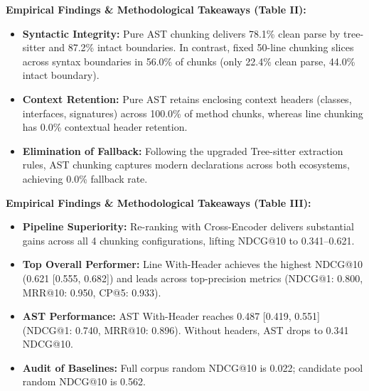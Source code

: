 \documentclass[11pt,a4paper,landscape]{article}
\begin{document}

\FloatBarrier
\vspace{-0.1cm}
{\small
\noindent\textbf{Empirical Findings \& Methodological Takeaways (Table II):}
\begin{itemize}[nosep,topsep=2pt,partopsep=0pt,itemsep=2pt]
    \item \textbf{Syntactic Integrity:} Pure AST chunking delivers 78.1\% clean parse by tree-sitter and 87.2\% intact boundaries. In contrast, fixed 50-line chunking slices across syntax boundaries in 56.0\% of chunks (only 22.4\% clean parse, 44.0\% intact boundary).
    \item \textbf{Context Retention:} Pure AST retains enclosing context headers (classes, interfaces, signatures) across 100.0\% of method chunks, whereas line chunking has 0.0\% contextual header retention.
    \item \textbf{Elimination of Fallback:} Following the upgraded Tree-sitter extraction rules, AST chunking captures modern declarations across both ecosystems, achieving 0.0\% fallback rate.
\end{itemize}
}
\clearpage


\FloatBarrier
\vspace{-0.1cm}
{\footnotesize
\noindent\textbf{Empirical Findings \& Methodological Takeaways (Table III):}
\begin{itemize}[nosep,topsep=2pt,partopsep=0pt,itemsep=2pt]
    \item \textbf{Pipeline Superiority:} Re-ranking with Cross-Encoder delivers substantial gains across all 4 chunking configurations, lifting NDCG@10 to 0.341--0.621.
    \item \textbf{Top Overall Performer:} Line With-Header achieves the highest NDCG@10 (0.621 [0.555, 0.682]) and leads across top-precision metrics (NDCG@1: 0.800, MRR@10: 0.950, CP@5: 0.933).
    \item \textbf{AST Performance:} AST With-Header reaches 0.487 [0.419, 0.551] (NDCG@1: 0.740, MRR@10: 0.896). Without headers, AST drops to 0.341 NDCG@10.
    \item \textbf{Audit of Baselines:} Full corpus random NDCG@10 is 0.022; candidate pool random NDCG@10 is 0.562.
\end{itemize}
}
\clearpage
\end{document}
